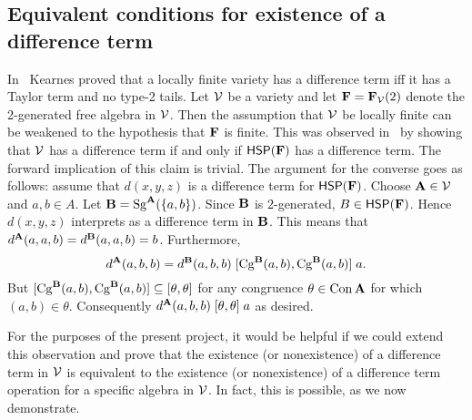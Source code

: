 \subsection{Equivalent conditions for existence of a difference term}
In~\cite{MR1358491} Kearnes proved that
a locally finite variety has a difference term
iff it has a Taylor term and no type-2 tails.
Let $\mathcal{V}$ be a variety and let $\mathbf{F} = \mathbf{F}_{\mathcal{V}}(2)$ denote the 2-generated
free algebra in $\mathcal{V}$.
Then the assumption that $\mathcal{V}$ be locally finite can be weakened
to the hypothesis that $\mathbf{F}$ is finite. This was observed in~\cite{MR1358491} 
by showing that $\mathcal{V}$ has a difference term if and only if $\mathsf{H} \mathsf{S} \mathsf{P}(\mathbf{F})$
has a difference term.
The forward implication of this claim is trivial. 
The argument for the converse goes as follows:
assume that $d(x, y, z)$ is a difference term for $\mathsf{H} \mathsf{S} \mathsf{P}(\mathbf{F})$.
Choose $\mathbf{A} \in \mathcal{V}$ and $a, b \in A$. Let $\mathbf{B} = \operatorname{Sg}^{\mathbf{A}} (\{a, b\})$.
Since $\mathbf{B}$ is 2-generated, $B \in \mathsf{H} \mathsf{S} \mathsf{P} (\mathbf{F})$.
Hence $d(x, y, z)$ interprets as a difference term in $\mathbf{B}$. This means that
$d^{\mathbf{A}} (a, a, b) = d^{\mathbf{B}} (a, a, b) = b$.
Furthermore,
\[
d^{\mathbf{A}} (a, b, b) = d^{\mathbf{B}} (a, b, b) \mathrel{[\operatorname{Cg}^{\mathbf{B}} (a, b), \operatorname{Cg}^{\mathbf{B}} (a, b)]} a.
\]
But $[\operatorname{Cg}^{\mathbf{B}} (a, b), \operatorname{Cg}^{\mathbf{B}} (a,b)]\subseteq [\theta, \theta]$ for any congruence
$\theta \in \operatorname{Con} \mathbf{A}$ for which $(a, b) \in \theta$. Consequently
$d^{\mathbf{A}} (a, b, b) \mathrel{[\theta, \theta]} a$ as desired.

For the purposes of the present project,
it would be helpful if we could extend this observation and
prove that the existence (or nonexistence) of a difference term in $\mathcal{V}$
is equivalent to the  existence (or nonexistence) of a difference term
operation for a specific algebra in $\mathcal{V}$.  In fact, this is possible, as we
now demonstrate.

